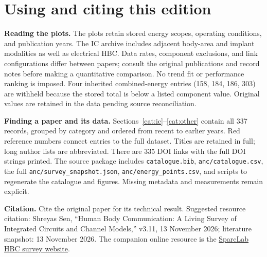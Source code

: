 \documentclass[10pt,letterpaper]{article}
\newcommand{\website}{\href{https://engineering.purdue.edu/~shreyas/SparcLab/HBC_Survey.html}{SparcLab HBC survey website}}
\begin{document}
\clearpage
\small
\section{Using and citing this edition}
\textbf{Reading the plots.} The plots retain stored energy scopes, operating conditions, and publication years. The IC archive includes adjacent body-area and implant modalities as well as electrical HBC. Data rates, component exclusions, and link configurations differ between papers; consult the original publications and record notes before making a quantitative comparison. No trend fit or performance ranking is imposed. Four inherited combined-energy entries (158, 184, 186, 303) are withheld because the stored total is below a listed component value. Original values are retained in the data pending source reconciliation.

\textbf{Finding a paper and its data.} Sections~\ref{cat:ic}--\ref{cat:other} contain all 337 records, grouped by category and ordered from recent to earlier years. Red reference numbers connect entries to the full dataset. Titles are retained in full; long author lists are abbreviated. There are 335 DOI links with the full DOI strings printed. The source package includes \texttt{catalogue.bib}, \texttt{anc/catalogue.csv}, the full \texttt{anc/survey\_snapshot.json}, \texttt{anc/energy\_points.csv}, and scripts to regenerate the catalogue and figures. Missing metadata and measurements remain explicit.

\textbf{Citation.} Cite the original paper for its technical result. Suggested resource citation: Shreyas Sen, ``Human Body Communication: A Living Survey of Integrated Circuits and Channel Models,'' v3.11, 13 November 2026; literature snapshot: 13 November 2026. The companion online resource is the \website.
\end{document}
